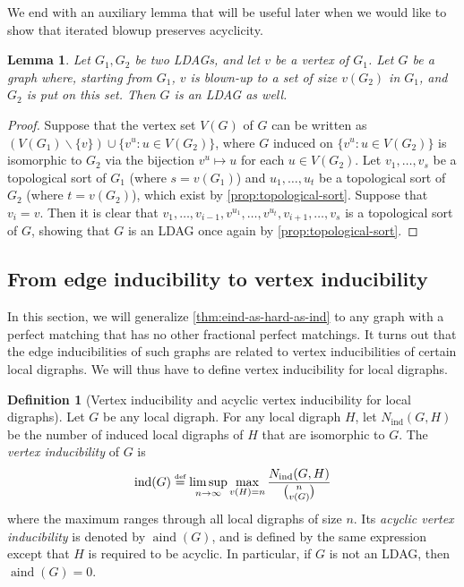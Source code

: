 \documentclass[reqno,11pt]{amsart}
\numberwithin{equation}{section}
\newtheorem{lemma}[theorem]{Lemma}
\theoremstyle{definition}
\newtheorem{definition}[theorem]{Definition}
\theoremstyle{remark}
\DeclareMathOperator{\ind}{ind}
\DeclareMathOperator{\aind}{aind}
\newcommand*{\eqdef}{\stackrel{\mbox{\normalfont\tiny def}}{=}}
\begin{document}
We end with an auxiliary lemma that will be useful later when we would like to show that iterated blowup preserves acyclicity.

\begin{lemma}\label{lem:LDAG-blowup}
    Let $G_1,G_2$ be two LDAGs, and let $v$ be a vertex of $G_1$.
    Let $G$ be a graph where, starting from $G_1$, $v$ is blown-up to a set of size $v(G_2)$ in $G_1$, and $G_2$ is put on this set.
    Then $G$ is an LDAG as well.
\end{lemma}
\begin{proof}
    Suppose that the vertex set $V(G)$ of $G$ can be written as $(V(G_1)\backslash \{v\})\cup \{v^u:u\in V(G_2)\}$, where $G$ induced on $\{v^u:u\in V(G_2)\}$ is isomorphic to $G_2$ via the bijection $v^u\mapsto u$ for each $u\in V(G_2)$.
    Let $v_1,\ldots, v_s$ be a topological sort of $G_1$ (where $s=v(G_1)$) and $u_1,\ldots, u_t$ be a topological sort of $G_2$ (where $t=v(G_2)$), which exist by \cref{prop:topological-sort}.
    Suppose that $v_i=v$.
    Then it is clear that $v_1,\ldots, v_{i-1}, v^{u_1},\ldots, v^{u_t},v_{i+1},\ldots, v_s$ is a topological sort of $G$, showing that $G$ is an LDAG once again by \cref{prop:topological-sort}.
\end{proof}


\subsection{From edge inducibility to vertex inducibility}

In this section, we will generalize \cref{thm:eind-as-hard-as-ind} to any graph with a perfect matching that has no other fractional perfect matchings.
It turns out that the edge inducibilities of such graphs are related to vertex inducibilities of certain local digraphs.
We will thus have to define vertex inducibility for local digraphs.

\begin{definition}[Vertex inducibility and acyclic vertex inducibility for local digraphs]\label{def:local-digraph-inducibility}
    Let $G$ be any local digraph.
    For any local digraph $H$, let $N_{\ind}(G,H)$ be the number of induced local digraphs of $H$ that are isomorphic to $G$.
    The \emph{vertex inducibility} of $G$ is
    \[\ind(G)\eqdef\limsup_{n\to\infty}\max_{v(H)=n}\frac{N_{\ind}(G,H)}{\binom{n}{v(G)}}\]
    where the maximum ranges through all local digraphs of size $n$.
    Its \emph{acyclic vertex inducibility} is denoted by $\aind(G)$, and is defined by the same expression except that $H$ is required to be acyclic.
    In particular, if $G$ is not an LDAG, then $\aind(G)=0$.
\end{definition}
\end{document}
